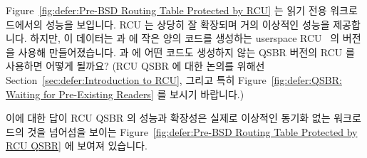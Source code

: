Figure~\ref{fig:defer:Pre-BSD Routing Table Protected by RCU}
는 읽기 전용 워크로드에서의 성능을 보입니다.
RCU 는 상당히 잘 확장되며 거의 이상적인 성능을 제공합니다.
하지만, 이 데이터는  과  에 작은 양의
코드를 생성하는 userspace
RCU~\cite{MathieuDesnoyers2009URCU,PaulMcKenney2013LWNURCU} 의 
버전을 사용해 만들어졌습니다.
 과  에 어떤 코드도 생성하지 않는
QSBR 버전의 RCU 를 사용하면 어떻게 될까요?
(RCU QSBR 에 대한 논의를 위해선
Section~\ref{sec:defer:Introduction to RCU},
그리고 특히
Figure~\ref{fig:defer:QSBR: Waiting for Pre-Existing Readers} 를 보시기
바랍니다.)

이에 대한 답이 RCU QSBR 의 성능과 확장성은 실제로 이상적인 동기화 없는
워크로드의 것을 넘어섬을 보이는
Figure~\ref{fig:defer:Pre-BSD Routing Table Protected by RCU QSBR}
에 보여져 있습니다.

